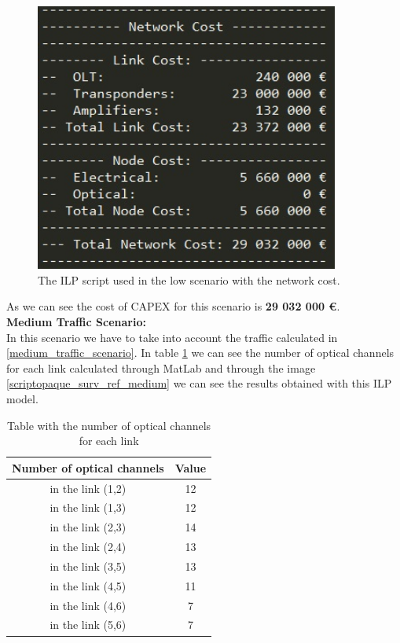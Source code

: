 \begin{figure}[h!]
\centering
\includegraphics[width=10cm]{sdf/ilp/opaque_protection/figures/script_opaque_protec_ref_low}
\caption{The ILP script used in the low scenario with the network cost.}
\label{scriptopaque_surv_ref_low}
\end{figure}

As we can see the cost of CAPEX for this scenario is \textbf{29 032 000 \euro}.\\


\textbf{Medium Traffic Scenario:}\\

In this scenario we have to take into account the traffic calculated in \ref{medium_traffic_scenario}. In table \ref{result_ILP2P_reference} we can see the number of optical channels for each link calculated through MatLab and through the image \ref{scriptopaque_surv_ref_medium} we can see the results obtained with this ILP model.\\

\begin{table}[h!]
\centering
\begin{tabular}{|| c | c||}
 \hline
 Number of optical channels & Value \\
 \hline\hline
 in the link (1,2) & 12 \\
 in the link (1,3) & 12 \\
 in the link (2,3) & 14 \\
 in the link (2,4) & 13 \\
 in the link (3,5) & 13 \\
 in the link (4,5) & 11 \\
 in the link (4,6) & 7 \\
 in the link (5,6) & 7 \\
 \hline
\end{tabular}
\caption{Table with the number of optical channels for each link}
\label{result_ILP2P_reference}
\end{table}
\newpage

